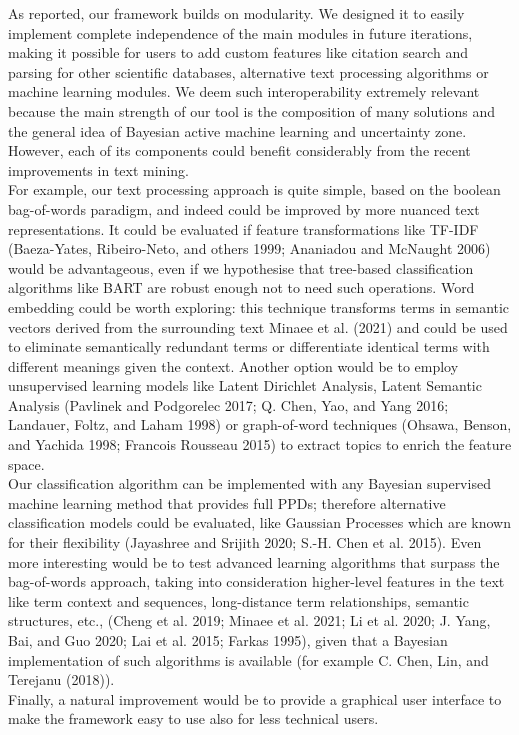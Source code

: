 \documentclass{article}
\begin{document}
As reported, our framework builds on modularity. We designed it to
easily implement complete independence of the main modules in future
iterations, making it possible for users to add custom features like
citation search and parsing for other scientific databases, alternative
text processing algorithms or machine learning modules. We deem such
interoperability extremely relevant because the main strength of our
tool is the composition of many solutions and the general idea of
Bayesian active machine learning and uncertainty zone. However, each of
its components could benefit considerably from the recent improvements
in text mining.\\
For example, our text processing approach is quite simple, based on the
boolean bag-of-words paradigm, and indeed could be improved by more
nuanced text representations. It could be evaluated if feature
transformations like TF-IDF (Baeza-Yates, Ribeiro-Neto, and others 1999;
Ananiadou and McNaught 2006) would be advantageous, even if we
hypothesise that tree-based classification algorithms like BART are
robust enough not to need such operations. Word embedding could be worth
exploring: this technique transforms terms in semantic vectors derived
from the surrounding text Minaee et al. (2021) and could be used to
eliminate semantically redundant terms or differentiate identical terms
with different meanings given the context. Another option would be to
employ unsupervised learning models like Latent Dirichlet Analysis,
Latent Semantic Analysis (Pavlinek and Podgorelec 2017; Q. Chen, Yao,
and Yang 2016; Landauer, Foltz, and Laham 1998) or graph-of-word
techniques (Ohsawa, Benson, and Yachida 1998; Francois Rousseau 2015) to
extract topics to enrich the feature space.\\
Our classification algorithm can be implemented with any Bayesian
supervised machine learning method that provides full PPDs; therefore
alternative classification models could be evaluated, like Gaussian
Processes which are known for their flexibility (Jayashree and Srijith
2020; S.-H. Chen et al. 2015). Even more interesting would be to test
advanced learning algorithms that surpass the bag-of-words approach,
taking into consideration higher-level features in the text like term
context and sequences, long-distance term relationships, semantic
structures, etc., (Cheng et al. 2019; Minaee et al. 2021; Li et al.
2020; J. Yang, Bai, and Guo 2020; Lai et al. 2015; Farkas 1995), given
that a Bayesian implementation of such algorithms is available (for
example C. Chen, Lin, and Terejanu (2018)).\\
Finally, a natural improvement would be to provide a graphical user
interface to make the framework easy to use also for less technical
users.
\end{document}
